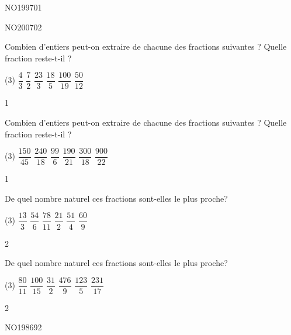 \documentclass[a4paper,12pt]{report}
\begin{document}
\begin{exof}{NO199}{70}{1}
\end{exof}
\begin{exof}{NO200}{70}{2}
\end{exof}

\begin{exo}{
Combien d'entiers peut-on extraire de chacune des fractions suivantes ?
Quelle fraction reste-t-il ?
	\begin{tasks}(3)
\task $\dfrac{4}{3}$
\task $\dfrac{7}{2}$
\task $\dfrac{23}{3}$
\task $\dfrac{18}{5}$
\task $\dfrac{100}{19}$
\task $\dfrac{50}{12}$
\end{tasks}
\vspace{1pt}}
{1}\end{exo}

\begin{exo}{
Combien d'entiers peut-on extraire de chacune des fractions suivantes ?
Quelle fraction reste-t-il ?
	\begin{tasks}(3)
\task $\dfrac{150}{45}$
\task $\dfrac{240}{18}$
\task $\dfrac{99}{6}$
\task $\dfrac{190}{21}$
\task $\dfrac{300}{18}$
\task $\dfrac{900}{22}$
\end{tasks}
\vspace{1pt}}
{1}\end{exo}

\begin{exo}{
De quel nombre naturel ces fractions sont-elles le plus proche?
	\begin{tasks}(3)
\task $\dfrac{13}{3}$
\task $\dfrac{54}{6}$
\task $\dfrac{78}{11}$
\task $\dfrac{21}{2}$
\task $\dfrac{51}{4}$
\task $\dfrac{60}{9}$
\end{tasks}
 \vspace{1pt}
}{2}\end{exo}


\begin{exo}{
De quel nombre naturel ces fractions sont-elles le plus proche?
	\begin{tasks}(3)
\task $\dfrac{80}{11}$
\task $\dfrac{100}{15}$
\task $\dfrac{31}{2}$
\task $\dfrac{476}{9}$
\task $\dfrac{123}{5}$
\task $\dfrac{231}{17}$
\end{tasks}
 \vspace{1pt}
}{2}\end{exo}


\begin{exof}{NO198}{69}{2}
\end{exof}
\end{document}
